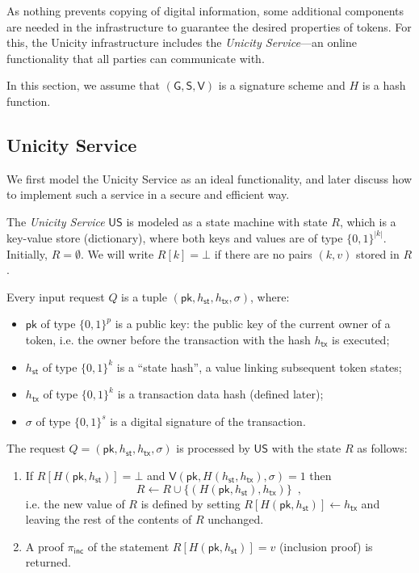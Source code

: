 \documentclass{article}
\newcommand{\bits}[1]{{\{0,1\}^{#1}}}
\newcommand{\keygen}[0]{\mathsf{G}}
\newcommand{\sig}[0]{\mathsf{S}}
\newcommand{\sigver}[0]{\mathsf{V}}
\newcommand{\pubkey}[0]{\mathsf{pk}}
\newcommand{\unisrv}[0]{\mathsf{US}}
\newcommand{\sthash}[0]{{h_\mathsf{st}}}
\newcommand{\txhash}[0]{{h_\mathsf{tx}}}
\newcommand{\pinc}[0]{{\pi_{\mathsf{inc}}}}
\begin{document}
As nothing prevents copying of digital information, some additional components are needed in the infrastructure to guarantee the desired properties of tokens. For this, the Unicity infrastructure includes the \emph{Unicity Service}---an online functionality that all parties can communicate with.


In this section, we assume that $(\keygen, \sig, \sigver)$ is a signature scheme and $H$ is a hash function.

\subsection{Unicity Service}\label{sec:unicity-service}

We first model the Unicity Service as an ideal functionality, and later discuss how to implement such a service in a secure and efficient way.

The \emph{Unicity Service} $\unisrv$ is modeled as a state machine with state $R$, which is a key-value store (dictionary), where both keys and values are of type $\bits{|k|}$. Initially, $R = \emptyset$. We will write $R[k] = \bot$ if there are no pairs $(k, v)$ stored in $R$.

Every input request $Q$ is a tuple $(\pubkey, \sthash, \txhash, \sigma)$, where:
\begin{itemize}
\item $\pubkey$ of type $\bits{p}$ is a public key: the public key of the current owner of a token, i.e. the owner before the transaction with the hash $\txhash$ is executed;
\item $\sthash$ of type $\bits{k}$ is a ``state hash'', a value linking subsequent token states;
\item $\txhash$ of type $\bits{k}$ is a transaction data hash (defined later);
\item $\sigma$ of type $\bits{s}$ is a digital signature of the transaction.
\end{itemize}

\noindent The request $Q=(\pubkey,\sthash,\txhash,\sigma)$ is processed by $\unisrv$ with the state $R$ as follows:
\begin{enumerate}
\item If $R[H(\pubkey, \sthash)] = \bot$ and $\sigver(\pubkey, H(\sthash, \txhash), \sigma) = 1$ then
\[
R \gets R \cup \{(H(\pubkey, \sthash), \txhash)\} \enspace,
\]
i.e. the new value of $R$ is defined by setting $R[H(\pubkey, \sthash)] \gets \txhash$ and leaving the rest of the contents of $R$ unchanged.
\item A proof $\pinc$ of the statement $R[H(\pubkey, \sthash)] = v$ (inclusion proof) is returned.
\end{enumerate}
\end{document}
